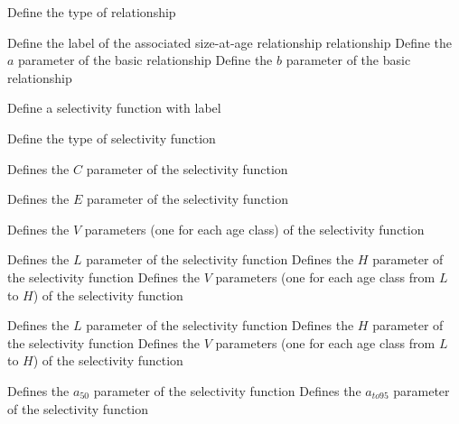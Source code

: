  {Define the type of relationship}
\par\textbf{}\par
\par\textbf{}\par
{} {Define the label of the associated size-at-age relationship relationship}
 {Define the $a$ parameter of the basic relationship}
 {Define the $b$ parameter of the basic relationship}
\par {} {Define a selectivity function with label}\par
{} {Define the type of selectivity function}
\par\textbf{}\par
{} {Defines the $C$ parameter of the selectivity function}
\par\textbf{}\par
{} {Defines the $E$ parameter of the selectivity function}
\par\textbf{}\par
{} {Defines the $V$ parameters (one for each age class) of the selectivity function}
\par\textbf{}\par
{} {Defines the $L$ parameter of the selectivity function}
 {Defines the $H$ parameter of the selectivity function}
 {Defines the $V$ parameters (one for each age class from $L$ to $H$) of the selectivity function}
\par\textbf{}\par
{} {Defines the $L$ parameter of the selectivity function}
 {Defines the $H$ parameter of the selectivity function}
 {Defines the $V$ parameters (one for each age class from $L$ to $H$) of the selectivity function}
\par\textbf{}\par
{} {Defines the $a_{50}$ parameter of the selectivity function}
 {Defines the $a_{to95}$ parameter of the selectivity function}
\par\textbf{}\par
